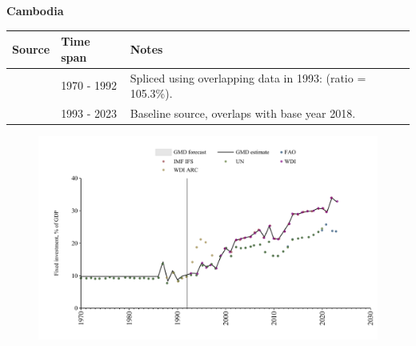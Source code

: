 \documentclass[12pt,a4paper,landscape]{article}
\begin{document}
\begin{adjustbox}{max totalsize={\paperwidth}{\paperheight},center}
\begin{minipage}[t][\textheight][t]{\textwidth}
\vspace*{0.5cm}
{}
\begin{center}
{\Large\bfseries Cambodia}
\end{center}
\vspace{0.5cm}
\begin{table}[H]
\centering
\small
\begin{tabular}{|l|l|l|}
\hline
\textbf{Source} & \textbf{Time span} & \textbf{Notes} \\
\hline
\rowcolor{white}\cite{UN}& 1970 - 1992 &Spliced using overlapping data in 1993: (ratio = 105.3\%).\\
\rowcolor{lightgray}\cite{WDI}& 1993 - 2023 &Baseline source, overlaps with base year 2018.\\
\hline
\end{tabular}
\end{table}
\begin{figure}[H]
\centering
\includegraphics[width=\textwidth,height=0.6\textheight,keepaspectratio]{graphs/KHM_finv_GDP.pdf}
\end{figure}
\end{minipage}
\end{adjustbox}
\end{document}
